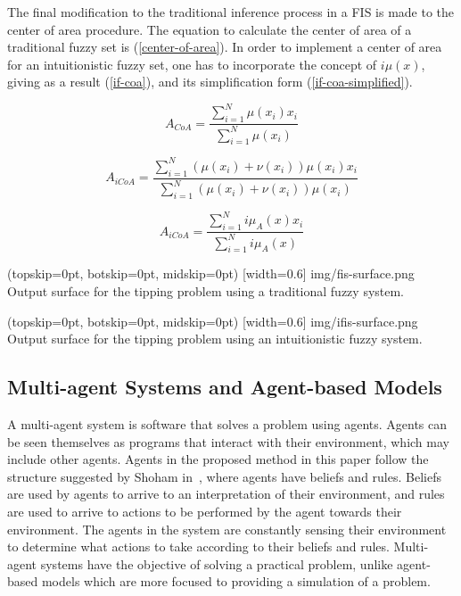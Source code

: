 \documentclass{ieeeaccess}
\begin{document}
The final modification to the traditional inference process in a FIS is made to
the center of area procedure. The equation to calculate the center of area of a
traditional fuzzy set is (\ref{center-of-area}). In order to implement a center
of area for an intuitionistic fuzzy set, one has to incorporate the concept of
$i\mu(x)$, giving as a result (\ref{if-coa}), and its simplification form
(\ref{if-coa-simplified}).

\begin{equation}
  \label{center-of-area}
  A_{CoA} = \dfrac{\sum_{i=1}^{N} \mu(x_{i})
    x_{i}}{\sum_{i=1}^{N} \mu(x_{i})}
\end{equation}

\begin{equation}
  \label{if-coa}
  A_{iCoA} = \dfrac{\sum_{i=1}^{N} (\mu(x_{i}) + \nu(x_{i})) \mu(x_{i})
    x_{i}}{\sum_{i=1}^{N} (\mu(x_{i}) + \nu(x_{i})) \mu(x_{i})}
\end{equation}

\begin{equation}
  \label{if-coa-simplified}
  A_{iCoA} = \dfrac{\sum_{i=1}^{N} i\mu_{A}(x) x_{i}}{\sum_{i=1}^{N}
    i\mu_{A}(x)}
\end{equation}

\Figure[](topskip=0pt, botskip=0pt, midskip=0pt)
[width=0.6\linewidth]
{img/fis-surface.png}
{Output surface for the tipping problem using a traditional fuzzy system.
  \label{figure:tipping-output-surface}}

\Figure[](topskip=0pt, botskip=0pt, midskip=0pt)
[width=0.6\linewidth]
{img/ifis-surface.png}
{Output surface for the tipping problem using an intuitionistic fuzzy system.
  \label{figure:ifis-tipping-output-surface}}

\subsection{Multi-agent Systems and Agent-based Models}
\label{subsection:multi-agent-systems-and-agent-based-models}

A multi-agent system is software that solves a problem using agents. Agents can
be seen themselves as programs that interact with their environment, which may
include other agents. Agents in the proposed method in this paper follow the
structure suggested by Shoham in~\cite{Shoham1993}, where agents have
beliefs and rules. Beliefs are used by agents to arrive to an interpretation of
their environment, and rules are used to arrive to actions to be performed by
the agent towards their environment. The agents in the system are constantly
sensing their environment to determine what actions to take according to their
beliefs and rules. Multi-agent systems have the objective of solving a practical
problem, unlike agent-based models which are more focused to providing a
simulation of a problem.
\end{document}
